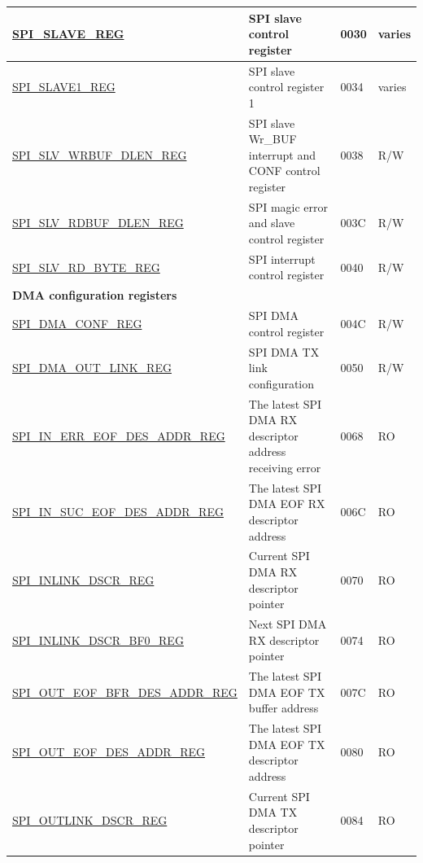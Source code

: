 \begin{longtable}{ | p{6cm} | p{7.2cm} | p{1.3cm} | p{1cm} | }
\hyperref[regdesc:SPISLAVEREG]{SPI\_SLAVE\_REG} & SPI slave control register & \hexprefix{}0030 & varies \\ \hline
\hyperref[regdesc:SPISLAVE1REG]{SPI\_SLAVE1\_REG} & SPI slave control register 1 & \hexprefix{}0034 & varies \\ \hline
\hyperref[regdesc:SPISLVWRBUFDLENREG]{SPI\_SLV\_WRBUF\_DLEN\_REG} & SPI slave Wr\_BUF interrupt and CONF control register & \hexprefix{}0038 & R/W \\ \hline
\hyperref[regdesc:SPISLVRDBUFDLENREG]{SPI\_SLV\_RDBUF\_DLEN\_REG} & SPI magic error and slave control register & \hexprefix{}003C & R/W \\ \hline
\hyperref[regdesc:SPISLVRDBYTEREG]{SPI\_SLV\_RD\_BYTE\_REG} & SPI interrupt control register & \hexprefix{}0040 & R/W \\ \hline
\multicolumn{4}{|l|}{\textbf{DMA configuration registers}} \\ \hline
\hyperref[regdesc:SPIDMACONFREG]{SPI\_DMA\_CONF\_REG} & SPI DMA control register & \hexprefix{}004C & R/W \\ \hline
\hyperref[regdesc:SPIDMAOUTLINKREG]{SPI\_DMA\_OUT\_LINK\_REG} & SPI DMA TX link configuration & \hexprefix{}0050 & R/W \\ \hline
\hyperref[regdesc:SPIINERREOFDESADDRREG]{SPI\_IN\_ERR\_EOF\_DES\_ADDR\_REG} & The latest SPI DMA RX descriptor address receiving error & \hexprefix{}0068 & RO \\ \hline
\hyperref[regdesc:SPIINSUCEOFDESADDRREG]{SPI\_IN\_SUC\_EOF\_DES\_ADDR\_REG} & The latest SPI DMA EOF RX descriptor address & \hexprefix{}006C & RO \\ \hline
\hyperref[regdesc:SPIINLINKDSCRREG]{SPI\_INLINK\_DSCR\_REG} & Current SPI DMA RX descriptor pointer & \hexprefix{}0070 & RO \\ \hline
\hyperref[regdesc:SPIINLINKDSCRBF0REG]{SPI\_INLINK\_DSCR\_BF0\_REG} & Next SPI DMA RX descriptor pointer & \hexprefix{}0074 & RO \\ \hline
\hyperref[regdesc:SPIOUTEOFBFRDESADDRREG]{SPI\_OUT\_EOF\_BFR\_DES\_ADDR\_REG} & The latest SPI DMA EOF TX buffer address & \hexprefix{}007C & RO \\ \hline
\hyperref[regdesc:SPIOUTEOFDESADDRREG]{SPI\_OUT\_EOF\_DES\_ADDR\_REG} & The latest SPI DMA EOF TX descriptor address & \hexprefix{}0080 & RO \\ \hline
\hyperref[regdesc:SPIOUTLINKDSCRREG]{SPI\_OUTLINK\_DSCR\_REG} & Current SPI DMA TX descriptor pointer & \hexprefix{}0084 & RO \\ \hline

\end{longtable}

